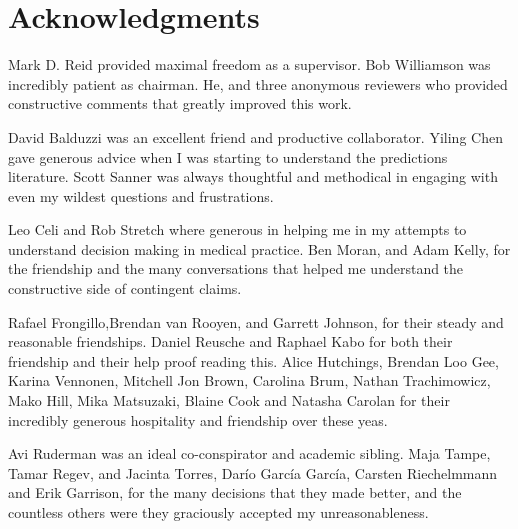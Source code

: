 \chapter*{Acknowledgments}

Mark D. Reid provided maximal freedom as a supervisor.
Bob Williamson was incredibly patient as chairman.
He, and three anonymous reviewers who provided constructive comments that greatly improved this work.  

David Balduzzi was an excellent friend and productive collaborator.
Yiling Chen gave generous advice when I was starting to understand the predictions literature.
Scott Sanner was always thoughtful and methodical in engaging with even my wildest questions and frustrations.


Leo Celi and Rob Stretch where generous in helping me in my attempts to understand decision making in medical practice.
Ben Moran, and Adam Kelly, for the friendship and the many conversations that helped me understand the constructive side of contingent claims.


Rafael Frongillo,Brendan van Rooyen, and Garrett Johnson, for their steady and reasonable friendships.
Daniel Reusche and Raphael Kabo for both their friendship and their help proof reading this.
Alice Hutchings, Brendan Loo Gee, Karina Vennonen, Mitchell Jon Brown, Carolina Brum, Nathan Trachimowicz, Mako Hill, Mika Matsuzaki, Blaine Cook and Natasha Carolan for their incredibly generous hospitality and friendship over these yeas.

Avi Ruderman was an ideal co-conspirator and academic sibling. 
Maja Tampe, Tamar Regev, and Jacinta Torres, Dar\'io Garc\'ia Garc\'ia, Carsten Riechelmmann and Erik Garrison, for the many decisions that they made better, and the countless others were they graciously accepted my unreasonableness. 


